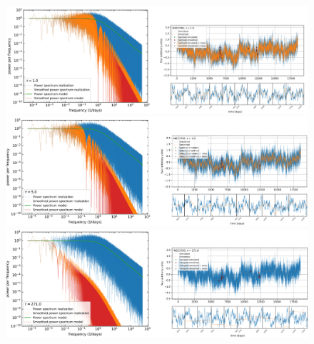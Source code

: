 \begin{figure}
\begin{center}
    {
  \includegraphics[width=\textwidth]{Figs/Chapter5/NGC3783/Screenshots/NGC3783_tau1_LC_spectrum.pdf} \\
  \includegraphics[width=\textwidth]{Figs/Chapter5/NGC3783/Screenshots/NGC3783_tau5_LC_spectrum.pdf} \\
  \includegraphics[width=\textwidth]{Figs/Chapter5/NGC3783/Screenshots/NGC3783_tau271_LC_spectrum.pdf} \\
    \label{fig:power_spectra_1_NGC3783}
  }
\end{center}
\end{figure}

